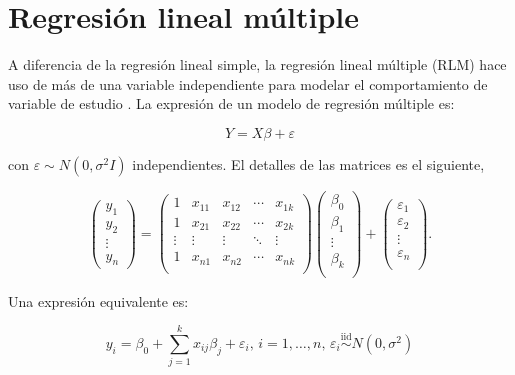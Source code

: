 \documentclass[
  11pt,
]{book}
\theoremstyle{definition}
\theoremstyle{definition}
\theoremstyle{definition}
\theoremstyle{definition}
\theoremstyle{remark}
\begin{document}
\section{Regresión lineal múltiple}\label{regresion-lineal-multiple}

A diferencia de la regresión lineal simple, la regresión lineal múltiple (RLM) hace uso de más de una variable independiente para modelar el comportamiento de variable de estudio \citep[página 528]{Devore}. La expresión de un modelo de regresión múltiple es:

\begin{equation}
Y = X\beta + \varepsilon
\label{eq:multiple1}
\end{equation}

con \(\varepsilon \sim N(0,\sigma^2I)\) independientes. El detalles de las matrices es el siguiente,

\begin{equation}
\begin{pmatrix}
y_1\\
y_2\\
\vdots\\
y_n
\end{pmatrix}
=
\begin{pmatrix}
1 & x_{11} & x_{12} & \cdots & x_{1k}\\
1 & x_{21} & x_{22} & \cdots & x_{2k}\\
\vdots & \vdots & \vdots & \ddots & \vdots \\
1 & x_{n1} & x_{n2} & \cdots & x_{nk}\\
\end{pmatrix} 
\begin{pmatrix}
\beta_0\\
\beta_1\\
\vdots \\
\beta_k\\
\end{pmatrix}
+
\begin{pmatrix}
\varepsilon_1\\
\varepsilon_2\\
\vdots \\
\varepsilon_n\\
\end{pmatrix}.
\label{eq:multiple2}
\end{equation}

Una expresión equivalente es:

\begin{equation}
y_i = \beta_0 + \sum_{j=1}^k x_{ij}\beta_j +\varepsilon_i\text{, } i = 1,\dots,n \text{, } \varepsilon_i \overset{\text{iid}}{\sim} N(0,\sigma^2)
\label{eq:multiple3}
\end{equation}
\end{document}

